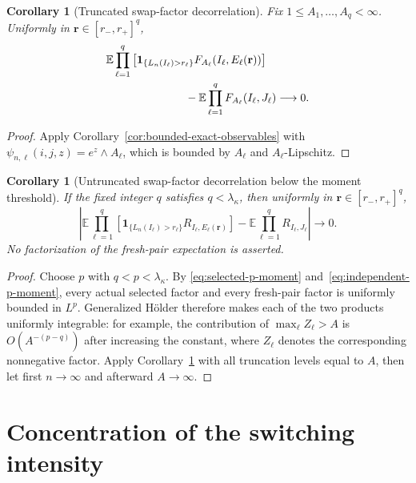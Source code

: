 \documentclass[11pt]{article}
\newcommand{\E}{\mathbb E}
\newcommand{\1}{\mathbf 1}
\newtheorem{corollary}[theorem]{Corollary}
\theoremstyle{definition}
\theoremstyle{remark}
\begin{document}
\begin{corollary}[Truncated swap-factor decorrelation]
\label{cor:truncated-swap-decorrelation}
Fix $1\leq A_1,\dots,A_q<\infty$.  Uniformly in
$\mathbf r\in[r_-,r_+]^q$,
\begin{align}
 &\E\prod_{\ell=1}^q
 \left[
  \1_{\{L_n(I_\ell)>r_\ell\}}
  F_{A_\ell}(I_\ell,E_\ell(\mathbf r))
 \right]
 \nonumber\\
 &\hspace{25mm}
 -\E\prod_{\ell=1}^qF_{A_\ell}(I_\ell,J_\ell)
 \longrightarrow0.
 \label{eq:endpoint-decorrelation}
\end{align}
\end{corollary}

\begin{proof}
Apply Corollary~\ref{cor:bounded-exact-observables} with
$\psi_{n,\ell}(i,j,z)=e^z\wedge A_\ell$, which is bounded by $A_\ell$
and $A_\ell$-Lipschitz.
\end{proof}

\begin{corollary}[Untruncated swap-factor decorrelation below the moment threshold]
\label{cor:untruncated-swap-decorrelation}
If the fixed integer $q$ satisfies $q<\lambda_\kappa$, then uniformly in
$\mathbf r\in[r_-,r_+]^q$,
\begin{equation}\label{eq:untruncated-swap-decorrelation}
 \left|
 \E\prod_{\ell=1}^q
 \left[
  \1_{\{L_n(I_\ell)>r_\ell\}}
  R_{I_\ell,E_\ell(\mathbf r)}
 \right]
 -\E\prod_{\ell=1}^qR_{I_\ell,J_\ell}
 \right|
 \longrightarrow0.
\end{equation}
No factorization of the fresh-pair expectation is asserted.
\end{corollary}

\begin{proof}
Choose $p$ with $q<p<\lambda_\kappa$.  By
\eqref{eq:selected-p-moment} and~\eqref{eq:independent-p-moment}, every
actual selected factor and every fresh-pair factor is uniformly bounded
in $L^p$.  Generalized H\"older therefore makes each of the two products
uniformly integrable: for example, the contribution of
$\max_\ell Z_\ell>A$ is $O(A^{-(p-q)})$ after increasing the constant,
where $Z_\ell$ denotes the corresponding nonnegative factor.  Apply
Corollary~\ref{cor:truncated-swap-decorrelation} with all truncation
levels equal to $A$, then let first $n\to\infty$ and afterward
$A\to\infty$.
\end{proof}

\section{Concentration of the switching intensity}
\label{sec:switching-intensity}
\end{document}
